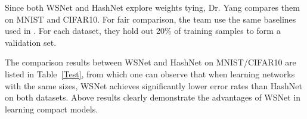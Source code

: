 \documentclass[10pt,twocolumn,letterpaper]{article}
\begin{document}
Since both WSNet and HashNet \cite{DBLP:journals/corr/ChenWTWC15} explore weights tying, Dr. Yang compares them on MNIST and CIFAR10. For fair comparison, the team use the same baselines used in \cite{Chen2016Compressing}. For each dataset, they hold out 20\% of training samples to form a validation set. 

The comparison results between WSNet and HashNet on MNIST/CIFAR10 are listed in Table~\ref{Test}, from which one can observe that when learning networks with the same sizes, WSNet achieves significantly lower error rates than HashNet on both datasets. Above results clearly demonstrate the advantages of WSNet in learning compact models.



{\small


}
\end{document}
